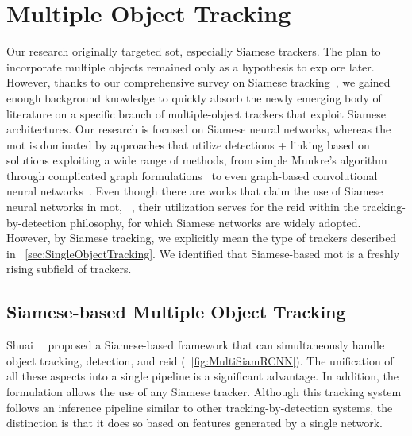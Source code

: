 \section{Multiple Object Tracking}
\label{sec:MultipleObjectTracking}

Our research originally targeted \gls{sot}, especially Siamese trackers. The plan to incorporate multiple objects remained only as a hypothesis to explore later. However, thanks to our comprehensive survey on Siamese tracking~\cite{ondrasovic2021siamese}, we gained enough background knowledge to quickly absorb the newly emerging body of literature on a specific branch of multiple-object trackers that exploit Siamese architectures. Our research is focused on Siamese neural networks, whereas the \gls{mot} is dominated by approaches that utilize detections + linking based on solutions exploiting a wide range of methods, from simple Munkre's algorithm~\cite{munkres1957assignment} through complicated graph formulations~\cite{chen2001motdynamicgraph} to even graph-based convolutional neural networks~\cite{papakis2021gcnnmatch}. Even though there are works that claim the use of Siamese neural networks in \gls{mot}, \egtext{}~\cite{cuan2018deepsiammot}, their utilization serves for the \gls{reid} within the tracking-by-detection philosophy, for which Siamese networks are widely adopted. However, by Siamese tracking, we explicitly mean the type of trackers described in \sectiontext{}~\ref{sec:SingleObjectTracking}. We identified that Siamese-based \gls{mot} is a freshly rising subfield of trackers.

\subsection{Siamese-based Multiple Object Tracking}
\label{ssec:SiameseBasedMultipleObjectTracking}

Shuai~\etal{}~\cite{shuai2020multisiamrcnn} proposed a Siamese-based framework that can simultaneously handle object tracking, detection, and \gls{reid} (\figtext{}~\ref{fig:MultiSiamRCNN}). The unification of all these aspects into a single pipeline is a significant advantage. In addition, the formulation allows the use of any Siamese tracker. Although this tracking system follows an inference pipeline similar to other tracking-by-detection systems, the distinction is that it does so based on features generated by a single network.

